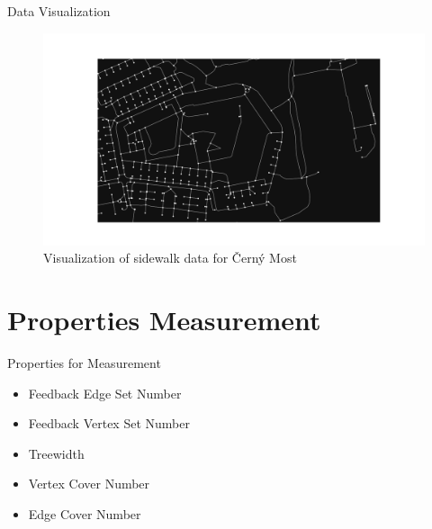 \documentclass{beamer}
\begin{document}
\begin{frame}[fragile, t]{Data Visualization}
    \begin{figure}
        \includegraphics[width=1.0\linewidth]{img/cerny_most_visualization.png}
        \caption{Visualization of sidewalk data for Černý Most}
    \end{figure}
\end{frame}

\section{Properties Measurement}
\begin{frame}{Properties for Measurement}
    \begin{itemize}
        \item Feedback Edge Set Number
        \item Feedback Vertex Set Number
        \item Treewidth
        \item Vertex Cover Number
        \item Edge Cover Number
    \end{itemize}
\end{frame}
\end{document}

